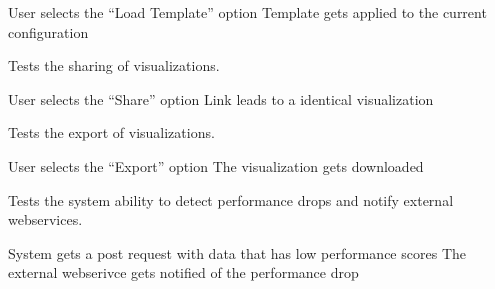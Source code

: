 {User selects the \enquote{Load Template} option}
{Template gets applied to the current configuration}


Tests the sharing of \glspl{visualization}.

{User selects the \enquote{Share} option}
{Link leads to a identical \gls{visualization}}


Tests the export of \glspl{visualization}.

{User selects the \enquote{Export} option}
{The \gls{visualization} gets downloaded}


Tests the system ability to detect performance drops and notify external webservices.

{System gets a post request with data that has low performance scores}
{The external webserivce gets notified of the performance drop}
